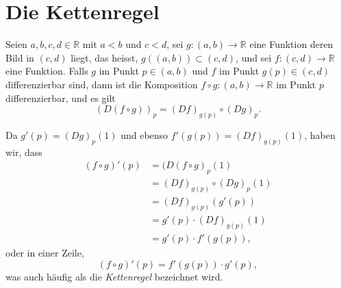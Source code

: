 \documentclass[../main.tex]{subfiles}
\begin{document}
\section{Die Kettenregel}

\begin{chainrule}
Seien 
$a, b, c, d \in \mathbb{R}$ mit $a < b$ und $c < d$,
sei $g \colon (a, b) \to \mathbb{R}$ 
eine Funktion
deren Bild in $(c, d)$ liegt, das heisst,
$g((a, b)) \subset (c, d)$,
und sei $f \colon (c, d) \to \mathbb{R}$ eine Funktion.
Falls $g$ im Punkt $p \in (a, b)$ und $f$ 
im Punkt $g(p) \in (c, d)$ differenzierbar sind,
dann ist die Komposition
$f \circ g \colon (a, b) \to \mathbb{R}$ 
im Punkt $p$ differenzierbar, und es gilt
\[
  {(D(f \circ g))}_p = {(Df)}_{g(p)} \circ {(Dg)}_p.
\]
\end{chainrule}

\begin{remark}
  Da $g'(p) = {(Dg)}_p(1)$ und
  ebenso $f'(g(p)) = {(Df)}_{g(p)}(1)$,
  haben wir, dass
  \begin{align*}
    (f \circ g)'(p)
    & = {(D(f \circ g)}_p(1) \\
    & = {(Df)}_{g(p)} \circ {(Dg)}_p(1) \\
    & = {(Df)}_{g(p)}(g'(p)) \\
    & = g'(p) \cdot {(Df)}_{g(p)}(1) \\
    & = g'(p) \cdot f'(g(p)),
  \end{align*}
  oder in einer Zeile,
  \[
    (f \circ g)'(p) = f'(g(p)) \cdot g'(p),
  \]
  was auch häufig als die \emph{Kettenregel}
  bezeichnet wird.
\end{remark}
\end{document}
